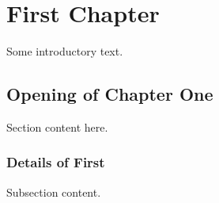 \chapter{First Chapter}

Some introductory text.

\section{Opening of Chapter One}

Section content here.

\subsection{Details of First}

Subsection content.
